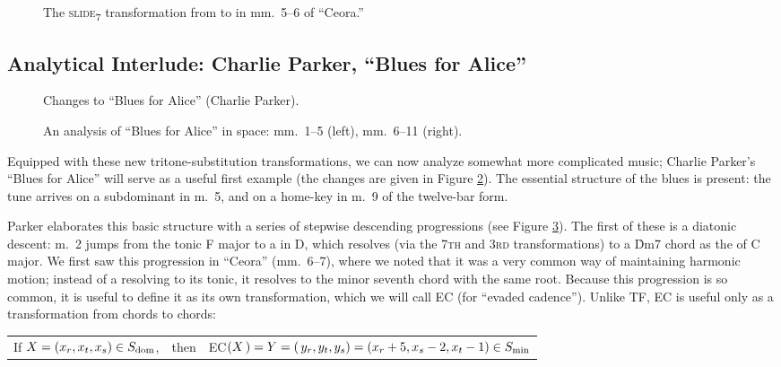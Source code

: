 \begin{figure}[htbp]
  \caption[The \protect\slideS transformation from \protect\h{Dbmaj7} to
  \protect\h{Dm7} in mm.~5--6 of ``Ceora.'']{The
    \textsc{slide}\textsubscript{7} transformation from \protect{}
    to \protect{} in mm.~5--6 of ``Ceora.''}
  \label{tft:slide7-ceora}
\end{figure}




\subsection{Analytical Interlude: Charlie Parker, “Blues for Alice”}
\label{sec:blues-for-alice}

\begin{figure}[tbp]
  \caption{Changes to ``Blues for Alice'' (Charlie Parker).}
  \label{tft:blues-alice-changes}
\end{figure}
\begin{figure}[btp]
  \caption[An analysis of ``Blues for Alice'' in \tf space]{An analysis of
    ``Blues for Alice'' in \tf space: mm.~1--5 (left), mm.~6--11 (right).}
  \label{tft:blues-alice-space}
\end{figure}

Equipped with these new tritone-substitution transformations, we can now
analyze somewhat more complicated music; Charlie Parker’s “Blues for Alice”
will serve as a useful first example (the changes are given in Figure
\ref{tft:blues-alice-changes}). The essential structure of the blues is
present: the tune arrives on a subdominant in m.~5, and on a home-key \tf in
m.~9 of the twelve-bar form.


Parker elaborates this basic structure with a series of stepwise descending
\tf progressions (see Figure \ref{tft:blues-alice-space}). The first of
these is a diatonic descent: m.~2 jumps from the tonic F  major to a \tf in D,
which resolves (via the \textsc{7th} and \textsc{3rd} transformations) to a
\h{Dm7} chord as the \ii of C major. We first saw this progression in
``Ceora'' (mm.~6--7), where we noted that it was a very common way of
maintaining harmonic motion; instead of a \tf resolving to its tonic, it resolves
to the minor seventh chord with the same root. Because this progression is so
common, it is useful to define it as its own transformation, which we will
call EC (for ``evaded cadence''). Unlike TF, EC is useful only as a
transformation from \V chords to \ii chords: \\
%
\vspace{0.5\baselineskip}
\addtolength{\tabcolsep}{-3pt}
\begin{tabular}{lcl}
  If $X = (x_r, x_t, x_s) \in S_{\mathrm{dom}}$, & then &
    EC$(X\,) = Y = (\,y_r, y_t, y_s) = (x_r+5, x_s-2, x_t-1) \in S_{\mathrm{min}}$
\end{tabular}
\addtolength{\tabcolsep}{3pt}
\vspace{0.5\baselineskip}

